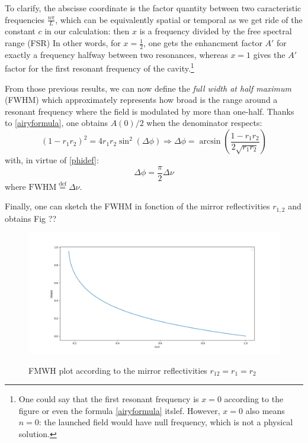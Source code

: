 \documentclass[10pt]{report}
\begin{document}
To clarify, the abscisse coordinate is the factor quantity between two caracteristic frequencies $\frac{n\pi}{L}$, which can be equivalently spatial or temporal as we get ride of the constant $c$ in our calculation: then $x$ is a frequency divided by the free spectral range (FSR) In other words, for $x=\frac{1}{2}$, one gets the enhancment factor $A'$ for exactly a frequency halfway between two resonances, whereas $x=1$ gives the $A'$ factor for the first resonant frequency of the cavity.\footnote{One could say that the first resonant frequency is $x=0$ according to the figure or even the formula \eqref{airyformula} itslef. However, $x=0$ also means $n=0$: the launched field would have null frequency, which is not a physical solution.}

From those previous results, we can now define the \textit{full width at half maximum} (FWHM) which approximately represents how broad is the range around a resonant frequency where the field is modulated by more than one-half. Thanks to \eqref{airyformula}, one obtains $ A(0) / 2$ when the denominator respects:
\begin{equation}
(1 - r_1 r_2)^2 = 4 r_1 r_2 \sin^2(\Delta\phi) \Rightarrow \Delta\phi = \arcsin \left(\frac{1 - r_1 r_2}{2\sqrt{r_1r_2}} \right)
\end{equation}
with, in virtue of \eqref{phidef}:
\begin{equation}
\Delta\phi = \frac{\pi}{2}\Delta\nu
\end{equation}
where $\textrm{FWHM} \stackrel{\text{def}}{=} \Delta\nu$.

Finally, one can sketch the FWHM in fonction of the mirror reflectivities $r_{1,2}$ and obtains Fig ??

\begin{figure}[h]
\caption{FMWH plot according to the mirror reflectivities $r_{12} = r_1 = r_2$}
\centering
\includegraphics[width=\textwidth]{airy-fmwh}
\label{fig:airy-fmwh}
\end{figure}
\end{document}
